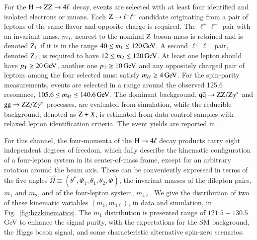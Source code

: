 For the $\mathrm{H}\to\mathrm{Z}\mathrm{Z}\to4\ell$ decay, events are selected with at least four
identified and isolated electrons or muons.  Each $\mathrm{Z}\to
\ell^+\ell^-$ candidate originating from a pair of leptons of the same
flavor and opposite charge is required.  The $\ell^+\ell^-$ pair with
an invariant mass, $m_1$, nearest to the nominal $\mathrm{Z}$ boson mass is
retained and is denoted $\mathrm{Z}_{1}$ if it is in the range $40 \le m_1
\le 120 \,\mathrm{Ge\hspace{-.08em}V}$.  A second $\ell^{+}\ell^{-}$ pair, denoted $\mathrm{Z}_{2}$,
is required to have $12 \le m_2 \le 120 \,\mathrm{Ge\hspace{-.08em}V}$.  At least one lepton
should have $p_{\mathrm{T}} \ge 20 \,\mathrm{Ge\hspace{-.08em}V}$, another one $p_{\mathrm{T}} \ge 10 \,\mathrm{Ge\hspace{-.08em}V}$ and any
oppositely charged pair of leptons among the four selected must
satisfy $m_{\ell\ell} \ge 4 \,\mathrm{Ge\hspace{-.08em}V}$. For the spin-parity measurements,
events are selected in a range around the observed 125.6~\GeV
resonance, $105.6 \le m_{4\ell} \le 140.6 \,\mathrm{Ge\hspace{-.08em}V}$.
%
The dominant background, $\mathrm{q}\mathrm{\overline{q}} \to \mathrm{Z}\mathrm{Z}/\mathrm{Z}\gamma^*$ and $\mathrm{g}\mathrm{g} \to
\mathrm{Z}\mathrm{Z}/\mathrm{Z}\gamma^*$ processes, are evaluated from simulation, while the
reducible background, denoted as $\mathrm{Z} + X$, is estimated from data
control samples with relaxed lepton identification criteria.
%
The event yields are reported in~~\cite{Chatrchyan:2013mxa}.

For this channel, the four-momenta of the $\mathrm{H} \rightarrow
4\mathrm{\ell}$ decay products carry eight independent degrees of
freedom, which fully describe the kinematic configuration of a
four-lepton system in its center-of-mass frame, except for an
arbitrary rotation around the beam axis. These can be conveniently
expressed in terms of the five angles $\vec\Omega\equiv(\theta^*,
\Phi_1, \theta_1, \theta_2, \Phi)$, the invariant masses of the
dilepton pairs, $m_{1}$ and $m_{2}$, and of the four-lepton system,
$m_{4\ell}$.  We give the distribution of two of these kinematic
variables $(m_1, m_{4\ell})$, in data and simulation, in
Fig.~\ref{fig:hzzkinematics}. The $m_1$ distribution is presented
range of $121.5 - 130.5$ GeV to enhance the signal purity, with the
expectations for the SM background, the Higgs boson signal, and some
characteristic alternative spin-zero scenarios.

